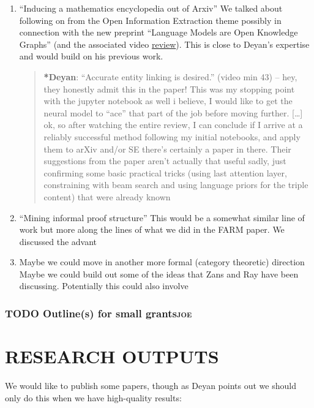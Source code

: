\documentclass[11pt]{article}
\begin{document}
\begin{enumerate}
\item ``Inducing a mathematics encyclopedia out of Arxiv''
\label{sec:org816306a}
We talked about following on from the Open Information Extraction
theme possibly in connection with the new preprint “Language Models
are Open Knowledge Graphs” (and the associated video \href{https://www.youtube.com/watch?v=NAJOZTNkhlI}{review}).  This is
close to Deyan’s expertise and would build on his previous work.

\begin{quote}
\textbf{*Deyan}: ``Accurate entity linking is desired.'' (video min 43) -- hey,
they honestly admit this in the paper! This was my stopping point with
the jupyter notebook as well i believe, I would like to get the neural
model to ``ace'' that part of the job before moving further. [\ldots{}]  ok,
so after watching the entire review, I can conclude if I arrive at a
reliably successful method following my initial notebooks, and apply
them to arXiv and/or SE there's certainly a paper in there. Their
suggestions from the paper aren't actually that useful sadly, just
confirming some basic practical tricks (using last attention layer,
constraining with beam search and using language priors for the triple
content) that were already known
\end{quote}
\item ``Mining informal proof structure''
\label{sec:org7c9df76}
This would be a somewhat similar line of work but more along the lines
of what we did in the FARM paper.  We discussed the advant

\item Maybe we could move in another more formal (category theoretic) direction
\label{sec:org08a2866}
Maybe we could build out some of the ideas that Zans and Ray have been
discussing. Potentially this could also involve
\end{enumerate}
\subsubsection{{\bfseries\sffamily TODO} Outline(s) for small grants\hfill{}\textsc{joe}}
\label{sec:org457647c}
\section{RESEARCH OUTPUTS}
\label{sec:orge05243e}
We would like to publish some papers, though as Deyan points out we
should only do this when we have high-quality results:
\end{document}
